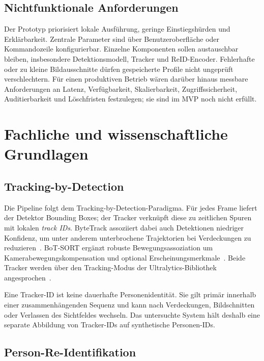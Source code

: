 \documentclass[runningheads]{llncs}
\begin{document}
\subsection{Nichtfunktionale Anforderungen}

Der Prototyp priorisiert lokale Ausführung, geringe Einstiegshürden und Erklärbarkeit. Zentrale Parameter sind über Benutzeroberfläche oder Kommandozeile konfigurierbar. Einzelne Komponenten sollen austauschbar bleiben, insbesondere Detektionsmodell, Tracker und ReID-Encoder. Fehlerhafte oder zu kleine Bildausschnitte dürfen gespeicherte Profile nicht ungeprüft verschlechtern. Für einen produktiven Betrieb wären darüber hinaus messbare Anforderungen an Latenz, Verfügbarkeit, Skalierbarkeit, Zugriffssicherheit, Auditierbarkeit und Löschfristen festzulegen; sie sind im MVP noch nicht erfüllt.

\section{Fachliche und wissenschaftliche Grundlagen}

\subsection{Tracking-by-Detection}

Die Pipeline folgt dem Tracking-by-Detection-Paradigma. Für jedes Frame liefert der Detektor Bounding Boxes; der Tracker verknüpft diese zu zeitlichen Spuren mit lokalen \emph{track IDs}. ByteTrack assoziiert dabei auch Detektionen niedriger Konfidenz, um unter anderem unterbrochene Trajektorien bei Verdeckungen zu reduzieren~\cite{zhang2022bytetrack}. BoT-SORT ergänzt robuste Bewegungsassoziation um Kamerabewegungskompensation und optional Erscheinungsmerkmale~\cite{aharon2022botsort}. Beide Tracker werden über den Tracking-Modus der Ultralytics-Bibliothek angesprochen~\cite{ultralytics-track}.

Eine Tracker-ID ist keine dauerhafte Personenidentität. Sie gilt primär innerhalb einer zusammenhängenden Sequenz und kann nach Verdeckungen, Bildschnitten oder Verlassen des Sichtfeldes wechseln. Das untersuchte System hält deshalb eine separate Abbildung von Tracker-IDs auf synthetische Personen-IDs.

\subsection{Person-Re-Identifikation}
\end{document}
